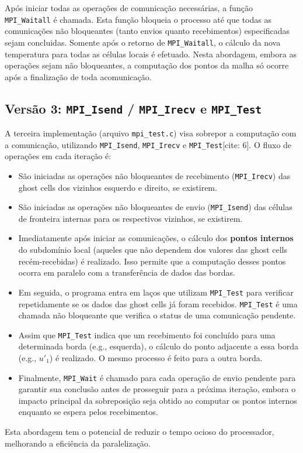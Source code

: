 \documentclass[a4paper, 12pt]{article}
\begin{document}
	Após iniciar todas as operações de comunicação necessárias, a função \texttt{MPI\_Waitall} é chamada. Esta função bloqueia o processo até que todas as comunicações não bloqueantes (tanto envios quanto recebimentos) especificadas sejam concluidas. Somente após o retorno de \texttt{MPI\_Waitall}, o cálculo da nova temperatura para todas as células locais é efetuado. Nesta abordagem, embora as operações sejam não bloqueantes, a computação dos pontos da malha só ocorre após a finalização de toda acomunicação.
	
	\subsection*{Versão 3: \texttt{MPI\_Isend} / \texttt{MPI\_Irecv} e \texttt{MPI\_Test}}
	A terceira implementa\c{c}\~ao (arquivo \texttt{mpi\_test.c}) visa sobrepor a computa\c{c}\~ao com a comunica\c{c}\~ao, utilizando \texttt{MPI\_Isend}, \texttt{MPI\_Irecv} e \texttt{MPI\_Test}[cite: 6]. O fluxo de opera\c{c}\~oes em cada itera\c{c}\~ao \'e:
	\begin{itemize}
		\item S\~ao iniciadas as opera\c{c}\~oes n\~ao bloqueantes de recebimento (\texttt{MPI\_Irecv}) das ghost cells dos vizinhos esquerdo e direito, se existirem.
		\item S\~ao iniciadas as opera\c{c}\~oes n\~ao bloqueantes de envio (\texttt{MPI\_Isend}) das c\'elulas de fronteira internas para os respectivos vizinhos, se existirem.
		\item Imediatamente ap\'os iniciar as comunica\c{c}\~oes, o c\'alculo dos \textbf{pontos internos} do subdom\'inio local (aqueles que n\~ao dependem dos valores das ghost cells rec\'em-recebidas) \'e realizado. Isso permite que a computa\c{c}\~ao desses pontos ocorra em paralelo com a transfer\^encia de dados das bordas.
		\item Em seguida, o programa entra em la\c{c}os que utilizam \texttt{MPI\_Test} para verificar repetidamente se os dados das ghost cells j\'a foram recebidos. \texttt{MPI\_Test} \'e uma chamada n\~ao bloqueante que verifica o status de uma comunica\c{c}\~ao pendente.
		\item Assim que \texttt{MPI\_Test} indica que um recebimento foi conclu\'ido para uma determinada borda (e.g., esquerda), o c\'alculo do ponto adjacente a essa borda (e.g., $u'_{1}$) \'e realizado. O mesmo processo \'e feito para a outra borda.
		\item Finalmente, \texttt{MPI\_Wait} \'e chamado para cada opera\c{c}\~ao de envio pendente para garantir sua conclus\~ao antes de prosseguir para a pr\'oxima itera\c{c}\~ao, embora o impacto principal da sobreposi\c{c}\~ao seja obtido ao computar os pontos internos enquanto se espera pelos recebimentos.
	\end{itemize}
	Esta abordagem tem o potencial de reduzir o tempo ocioso do processador, melhorando a efici\^encia da paraleliza\c{c}\~ao.
	
	
	
\end{document}
